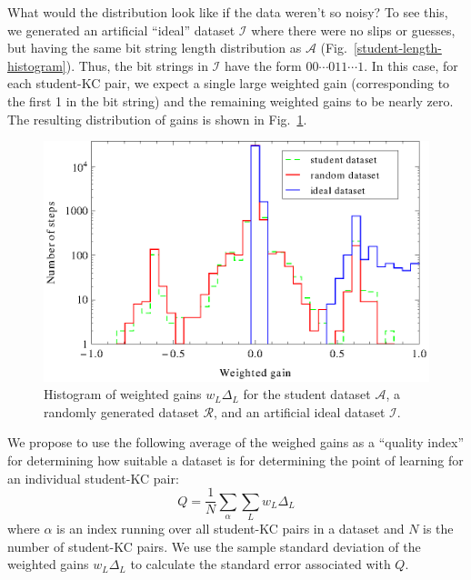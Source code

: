 \documentclass{acmlarge-edm}
\begin{document}
What would the distribution look like if the data weren't 
so noisy?  To see this, we generated an artificial ``ideal'' dataset
$\mathcal{I}$ where there were no slips or guesses, but having
the same bit string length distribution as $\mathcal{A}$ 
(Fig.~\ref{student-length-histogram}).  Thus, the bit strings
in $\mathcal{I}$ have the form $00\cdots011\cdots1$.
In this case, for each student-KC pair, we expect a single 
large weighted gain (corresponding to the first 1 in the bit string) 
and the remaining weighted gains to be nearly zero.  The resulting 
distribution of gains is shown
in  Fig.~\ref{weighted-gain-histogram2}.

\begin{figure}
  \centering \includegraphics{weighted-gain-histogram2.eps}
   \caption{Histogram of weighted gains $w_L \Delta_L$ for
     the student dataset $\mathcal{A}$, 
     a randomly generated dataset $\mathcal{R}$,
     and an artificial ideal dataset $\mathcal{I}$.}
    \label{weighted-gain-histogram2}
\end{figure}


We propose to use the following average of the weighed gains as
a ``quality index'' for determining how suitable a 
dataset is for determining the point of learning for an individual
student-KC pair:
%
\begin{equation}
           Q= \frac{1}{N} \sum_\alpha \sum_L w_L \Delta_L
\end{equation}
%
where $\alpha$ is an index running over all student-KC pairs in a 
dataset and $N$ is the number of student-KC pairs.
We use the sample standard deviation of the weighted gains $w_L \Delta_L$
to calculate the standard error associated with $Q$. 
\end{document}
